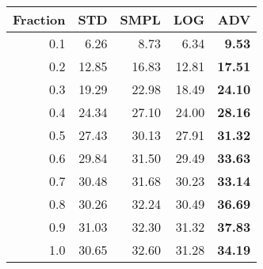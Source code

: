 \documentclass{standalone}
\begin{document}
\begin{tabular}{r|rrrr}
      \toprule
      Fraction & STD & SMPL & LOG & ADV\\
      \midrule
      0.1 & 6.26 & 8.73 & 6.34 & \textbf{9.53}\\
  0.2 & 12.85 & 16.83 & 12.81 & \textbf{17.51}\\
  0.3 & 19.29 & 22.98 & 18.49 & \textbf{24.10}\\
  0.4 & 24.34 & 27.10 & 24.00 & \textbf{28.16}\\
  0.5 & 27.43 & 30.13 & 27.91 & \textbf{31.32}\\
  0.6 & 29.84 & 31.50 & 29.49 & \textbf{33.63}\\
  0.7 & 30.48 & 31.68 & 30.23 & \textbf{33.14}\\
  0.8 & 30.26 & 32.24 & 30.49 & \textbf{36.69}\\
  0.9 & 31.03 & 32.30 & 31.32 & \textbf{37.83}\\
  1.0 & 30.65 & 32.60 & 31.28 & \textbf{34.19}\\
  \bottomrule
\end{tabular}
\end{document}
